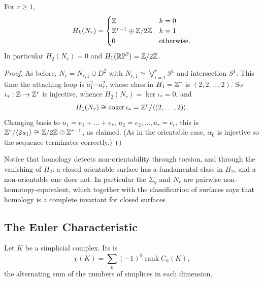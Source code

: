 \documentclass[a4paper]{scrartcl}
\newcommand{\coker}{\operatorname{coker}}
\newcommand{\RP}{\mathbb{RP}}
\newcommand{\genby}[1]{\langle #1 \rangle}
\begin{document}
\begin{center}
\end{center}

\begin{theorem} \label{thm:nonorientable-homology}
	For $r \geq 1$,
	$$
	H_k(N_r) = \begin{cases}\mathbb{Z} & k = 0\\ \mathbb{Z}^{r-1}\oplus \mathbb{Z}/2\mathbb{Z} & k = 1\\ 0 & \text{otherwise.}\end{cases}
	$$
	In particular $H_2(N_r) = 0$ and $H_1(\RP^2) = \Z/2\Z$.
\end{theorem}
\begin{proof}
	As before, $N_r = N_{r,1}\cup D^2$ with $N_{r,1}\simeq\bigvee_{i=1}^rS^1$ and intersection $S^1$. This time the attaching loop is $a_1^2\cdots a_r^2$, whose class in $H_1 = \mathbb{Z}^r$ is $(2,2,\dots,2)$. So $\iota_*: \mathbb{Z}\to\mathbb{Z}^r$ is injective, whence $H_2(N_r) = \ker\iota_* = 0$, and
	$$
	H_1(N_r) \cong \coker\iota_* = \Z^r/\genby{(2,\dots,2)}.
	$$
	Changing basis to $u_1 = e_1+\dots+e_r$, $u_2 = e_2,\dots,u_r = e_r$, this is $\Z^r/\genby{2u_1}\cong \Z/2\Z\oplus\Z^{r-1}$, as claimed. (As in the orientable case, $\alpha_0$ is injective so the sequence terminates correctly.)
\end{proof}

Notice that homology detects non-orientability through torsion, and through the vanishing
of $H_2$: a closed orientable surface has a fundamental class in $H_2$, and a
non-orientable one does not. In particular the $\Sigma_g$ and $N_r$ are pairwise
non-homotopy-equivalent, which together with the classification of surfaces says that
homology is a complete invariant for closed surfaces.

\subsection{The Euler Characteristic}

\begin{definition}
	Let $K$ be a simplicial complex. Its  is
	$$
	\chi(K) = \sum_k(-1)^k \operatorname{rank}C_k(K),
	$$
	the alternating sum of the numbers of simplices in each dimension.
\end{definition}
\end{document}
